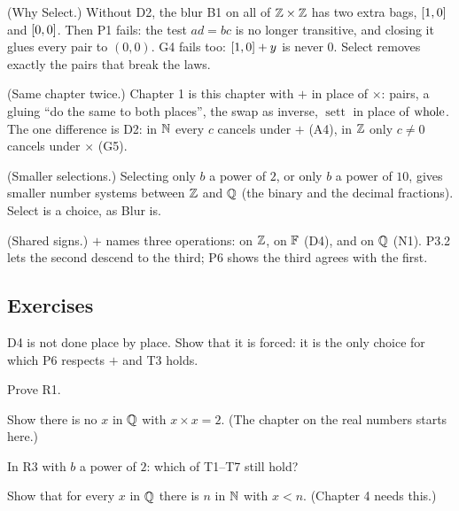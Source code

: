 \begin{lines}
\item[\lab{R1}] (Why Select.) Without D2, the blur B1 on all of $\mathbb{Z} \times \mathbb{Z}$ has two extra bags, $[1,0]$ and $[0,0]$. Then P1 fails: the test $ad = bc$ is no longer transitive, and closing it glues every pair to $(0,0)$. G4 fails too: $[1,0] + y$ is never $0$. Select removes exactly the pairs that break the laws.
\item[\lab{R2}] (Same chapter twice.) Chapter 1 is this chapter with $+$ in place of $\times$: pairs, a gluing ``do the same to both places'', the swap as inverse, $\operatorname{sett}$ in place of $\operatorname{whole}$. The one difference is D2: in $\mathbb{N}$ every $c$ cancels under $+$ (A4), in $\mathbb{Z}$ only $c \neq 0$ cancels under $\times$ (G5).
\item[\lab{R3}] (Smaller selections.) Selecting only $b$ a power of $2$, or only $b$ a power of $10$, gives smaller number systems between $\mathbb{Z}$ and $\mathbb{Q}$ (the binary and the decimal fractions). Select is a choice, as Blur is.
\item[\lab{R4}] (Shared signs.) $+$ names three operations: on $\mathbb{Z}$, on $\mathbb{F}$ (D4), and on $\mathbb{Q}$ (N1). P3.2 lets the second descend to the third; P6 shows the third agrees with the first.
\end{lines}

\subsection*{Exercises}

\begin{lines}
\item[\lab{E1}] D4 is not done place by place. Show that it is forced: it is the only choice for which P6 respects $+$ and T3 holds.
\item[\lab{E2}] Prove R1.
\item[\lab{E3}] Show there is no $x$ in $\mathbb{Q}$ with $x \times x = 2$. (The chapter on the real numbers starts here.)
\item[\lab{E4}] In R3 with $b$ a power of $2$: which of T1--T7 still hold?
\item[\lab{E5}] Show that for every $x$ in $\mathbb{Q}$ there is $n$ in $\mathbb{N}$ with $x < n$. (Chapter 4 needs this.)
\end{lines}

\newpage

